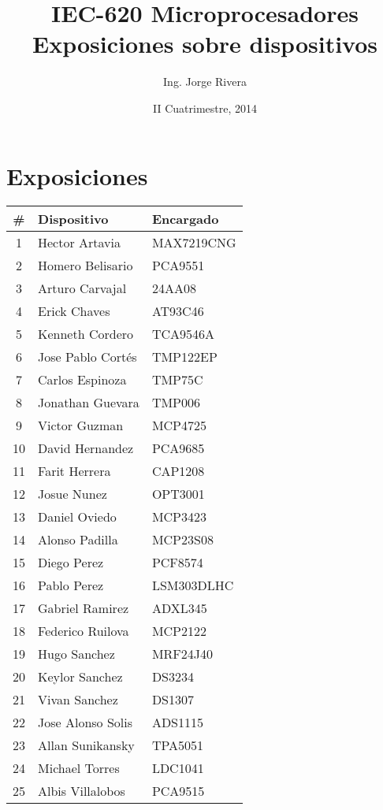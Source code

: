 \documentclass[letterpaper,10pt]{article}
\title{IEC-620 Microprocesadores\\ Exposiciones sobre dispositivos}
\author{Ing. Jorge Rivera}
\date{II Cuatrimestre, 2014}
\begin{document}
\maketitle

\section{Exposiciones}

\begin{center}
\begin{tabular}{|c|l|p{4in}|}\hline
\#  & Dispositivo		& Encargado		 \\ \hline\hline
1 & Hector Artavia		& MAX7219CNG\\\hline
2 & Homero Belisario	& PCA9551	\\\hline
3 & Arturo Carvajal		& 24AA08	\\\hline
4 & Erick Chaves		& AT93C46	\\\hline
5 & Kenneth Cordero		& TCA9546A		\\\hline
6 & Jose Pablo Cortés	& TMP122EP	\\\hline
7 & Carlos Espinoza		& TMP75C	\\\hline
8 & Jonathan Guevara	& TMP006	\\\hline
9 & Victor Guzman		& MCP4725	\\\hline
10 & David Hernandez	& PCA9685		\\\hline
11 & Farit Herrera		& CAP1208	\\\hline
12 & Josue Nunez		& OPT3001	\\\hline
13 & Daniel Oviedo		& MCP3423	\\\hline
14 & Alonso Padilla		& MCP23S08	\\\hline
15 & Diego Perez		& PCF8574	\\\hline
16 & Pablo Perez		& LSM303DLHC\\\hline
17 & Gabriel Ramirez	& ADXL345	\\\hline
18 & Federico Ruilova	& MCP2122	\\\hline
19 & Hugo Sanchez		& MRF24J40	\\\hline
20 & Keylor Sanchez		& DS3234	\\\hline
21 & Vivan Sanchez		& DS1307	\\\hline
22 & Jose Alonso Solis	& ADS1115 	\\\hline
23 & Allan Sunikansky	& TPA5051	\\\hline
24 & Michael Torres		& LDC1041	\\\hline
25 & Albis Villalobos	& PCA9515	\\\hline


\end{tabular}
\end{center}
\end{document}
